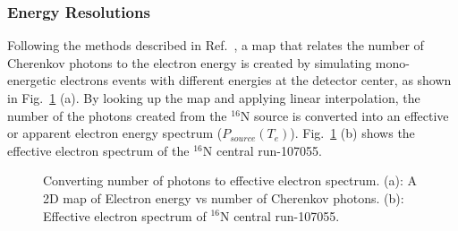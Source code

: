 \subsubsection{Energy Resolutions}
Following the methods described in Ref.~\cite{askins2015physics,waterunidoc}, a map that relates the number of Cherenkov photons to the electron energy is created by simulating mono-energetic electrons events with different energies at the detector center, as shown in Fig.~\ref{N16energyMap} (a). By looking up the map and applying linear interpolation, the number of the photons created from the $^{16}$N source is converted into an effective or apparent electron energy spectrum ($P_{source}(T_e)$)\cite{waterunidoc}. Fig.~\ref{N16energyMap} (b) shows the effective electron spectrum of the $^{16}$N central run-107055.

\begin{figure}[htbp]
	\centering
	\caption[Converting number of photons to effective electron spectrum.]{Converting number of photons to effective electron spectrum. (a): A 2D map of Electron energy vs number of Cherenkov photons. (b):	Effective electron spectrum of $^{16}$N central run-107055.\label{N16energyMap}}
\end{figure}


